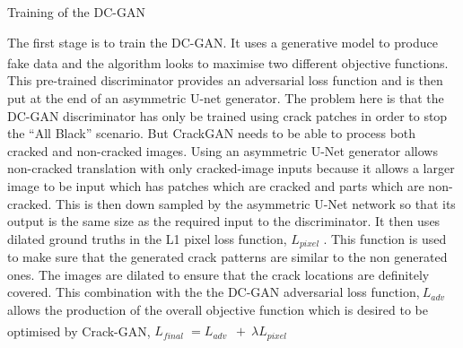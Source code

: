 \documentclass[11pt]{article}		%
\newcommand{\supercite}[1]{\textsuperscript{\cite{#1}}}		%
\begin{document}
    		Training of the DC-GAN
    		
   			The first stage is to train the DC-GAN. It uses a generative model to produce fake data and the algorithm looks to maximise two different objective functions.\supercite{CrackGAN1} This pre-trained discriminator provides an adversarial loss function and is then put at the end of an asymmetric U-net generator. The problem here is that the DC-GAN discriminator has only be trained using crack patches in order to stop the “All Black” scenario. But CrackGAN needs to be able to process both cracked and non-cracked images. Using an asymmetric U-Net generator allows non-cracked translation with only cracked-image inputs because it allows a larger image to be input which has patches which are cracked and parts which are non-cracked. This is then down sampled by the asymmetric U-Net network so that its output is the same size as the required input to the discriminator. It then uses dilated ground truths in the L1 pixel loss function, $L_{pixel\ \ }$. This function is used to make sure that the generated crack patterns are similar to the non generated ones. The images are dilated to ensure that the crack locations are definitely covered. This combination with the the DC-GAN adversarial loss function,$\ L_{adv\ \ \ }$  allows the production of the overall objective function which is desired to be optimised by Crack-GAN,
		    $L_{final\ \ }=L_{adv\ \ \ }+\ \lambda L_{pixel\ \ }$
		    \supercite{CrackGAN}
			\supercite{CrackGAN1}
		
\end{document}
